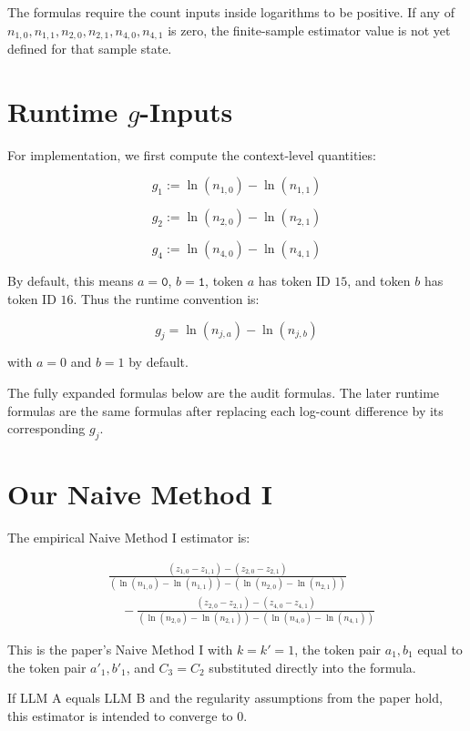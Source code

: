 \documentclass[11pt]{article}
\begin{document}
The formulas require the count inputs inside logarithms to be positive. If any of \(n_{1,0},n_{1,1},n_{2,0},n_{2,1},n_{4,0},n_{4,1}\) is zero, the finite-sample estimator value is not yet defined for that sample state.

\section{Runtime \(g\)-Inputs}

For implementation, we first compute the context-level quantities:

\[
g_1:=\ln(n_{1,0})-\ln(n_{1,1})
\]

\[
g_2:=\ln(n_{2,0})-\ln(n_{2,1})
\]

\[
g_4:=\ln(n_{4,0})-\ln(n_{4,1})
\]

By default, this means \(a=\texttt{0}\), \(b=\texttt{1}\), token \(a\) has token ID \(15\), and token \(b\) has token ID \(16\). Thus the runtime convention is:

\[
g_j=\ln(n_{j,a})-\ln(n_{j,b})
\]

with \(a=0\) and \(b=1\) by default.

The fully expanded formulas below are the audit formulas. The later runtime formulas are the same formulas after replacing each log-count difference by its corresponding \(g_j\).

\section{Our Naive Method I}

The empirical Naive Method I estimator is:

\[
\boxed{
\begin{aligned}
&
\frac{
    \left(z_{1,0}-z_{1,1}\right)-\left(z_{2,0}-z_{2,1}\right)
}{
    \left(\ln(n_{1,0})-\ln(n_{1,1})\right)
    -
    \left(\ln(n_{2,0})-\ln(n_{2,1})\right)
}
\\[1.25em]
&\quad -
\frac{
    \left(z_{2,0}-z_{2,1}\right)-\left(z_{4,0}-z_{4,1}\right)
}{
    \left(\ln(n_{2,0})-\ln(n_{2,1})\right)
    -
    \left(\ln(n_{4,0})-\ln(n_{4,1})\right)
}
\end{aligned}
}
\]

This is the paper's Naive Method I with \(k=k'=1\), the token pair \(a_1,b_1\) equal to the token pair \(a'_1,b'_1\), and \(C_3=C_2\) substituted directly into the formula.

If LLM A equals LLM B and the regularity assumptions from the paper hold, this estimator is intended to converge to \(0\).
\end{document}
